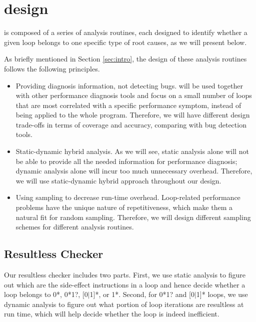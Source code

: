 \section{\Tool design}
\label{sec:design}
\Tool is composed of a series of analysis routines, each designed to 
identify whether a given loop belongs to one specific type of root causes,
as we will present below. 

As briefly mentioned in Section \ref{sec:intro}, the design of these analysis routines follows the following principles.
\begin{itemize}
\item Providing diagnosis information, not detecting bugs. \Tool will be  
used together with other performance diagnosis tools \cite{SongOOPSLA2014}
and focus on a small
number of loops that are most correlated with a specific performance symptom,
instead of being applied to the whole program. Therefore, we will have different
design trade-offs in terms of coverage and accuracy, comparing with 
bug detection tools.

\item Static-dynamic hybrid analysis. As we will see, static analysis alone
will not be able to provide all the needed information for performance
diagnosis; dynamic analysis alone will incur too much unnecessary overhead.
Therefore, we will use static-dynamic hybrid approach throughout our design.

\item Using sampling to decrease run-time overhead. Loop-related 
performance problems have the unique nature of repetitiveness, which make 
them a natural fit for random sampling. Therefore, we will design different
sampling schemes for different analysis routines.
\end{itemize}

\subsection{Resultless Checker}
\label{sec:workless}

Our resultless checker includes two parts. First, we use static analysis
to figure out which are the side-effect instructions in a loop and hence
decide whether a loop belongs to 0*, 0*1?, [0$|$1]*, or 1*. Second, for
0*1? and [0$|$1]* loops, we use
dynamic analysis to figure out what portion of loop iterations are
resultless at run time, which will help decide whether the loop is indeed
inefficient.


